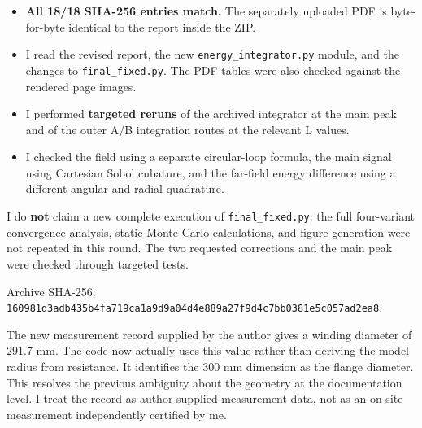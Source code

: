 \documentclass[10pt,a4paper]{article}
\begin{document}
{\par
\vspace{2pt}\par\vspace{0.5pt}
\par
\begin{itemize}\setlength{\itemsep}{0.5pt}\setlength{\parskip}{0pt}\setlength{\topsep}{1pt}
\item \textbf{All 18/18 SHA-256 entries match.} The separately uploaded PDF is byte-for-byte identical to the report inside the ZIP.
\item I read the revised report, the new \texttt{energy\_integrator.py} module, and the changes to \texttt{final\_fixed.py}. The PDF tables were also checked against the rendered page images.
\item I performed \textbf{targeted reruns} of the archived integrator at the main peak and of the outer A/B integration routes at the relevant L values.
\item I checked the field using a separate circular-loop formula, the main signal using Cartesian Sobol cubature, and the far-field energy difference using a different angular and radial quadrature.
\end{itemize}
\par
I do \textbf{not} claim a new complete execution of \texttt{final\_fixed.py}: the full four-variant convergence analysis, static Monte Carlo calculations, and figure generation were not repeated in this round. The two requested corrections and the main peak were checked through targeted tests.
\par
Archive SHA-256: \texttt{160981d3adb435b4fa719ca1a9d9a04d4e889a27f9d4c7bb0381e5c057ad2ea8}.
\par
\vspace{2pt}\par\vspace{0.5pt}
\par
The new measurement record supplied by the author gives a winding diameter of 291.7 mm. The code now actually uses this value rather than deriving the model radius from resistance. It identifies the 300 mm dimension as the flange diameter. This resolves the previous ambiguity about the geometry at the documentation level. I treat the record as author-supplied measurement data, not as an on-site measurement independently certified by me.
\par
}
\end{document}

